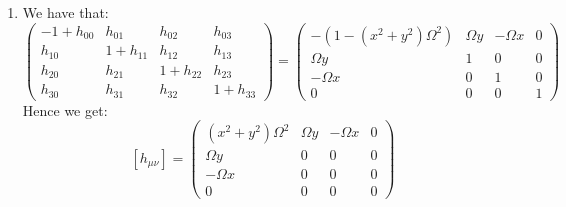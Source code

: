 \documentclass[10pt,a4paper]{article}
\begin{document}
\begin{enumerate}
\item We have that:
\[
\begin{pmatrix}
-1 + h_{00} & h_{01} & h_{02} & h_{03}\\
h_{10} & 1 + h_{11} & h_{12} & h_{13}\\
h_{2 0} & h_{21} & 1 + h_{22} & h_{23}\\
h_{30} & h_{31} & h_{32} & 1 + h_{33}
\end{pmatrix}
= 
\begin{pmatrix}
-(1 - (x^2 + y^2) \Omega^2) & \Omega y & -\Omega x & 0\\
\Omega y & 1 & 0 & 0\\
-\Omega x & 0 & 1 & 0\\
0 & 0 & 0 & 1
\end{pmatrix}
\]
Hence we get:
\[
[h_{\mu \nu}] = \begin{pmatrix}
(x^2 + y^2) \Omega^2 & \Omega y & - \Omega x & 0\\
\Omega y & 0 & 0 & 0\\
-\Omega x & 0 & 0 & 0\\
0 & 0 & 0 & 0
\end{pmatrix}
\]

\end{enumerate}
\end{document}
